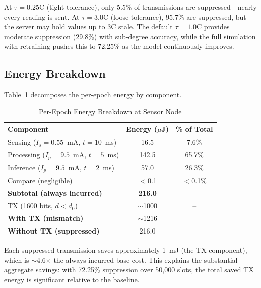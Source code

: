 \documentclass[conference]{IEEEtran}
\begin{document}
At $\tau = 0.25$\textdegree C (tight tolerance), only 5.5\% of transmissions are suppressed---nearly every reading is sent. At $\tau = 3.0$\textdegree C (loose tolerance), 95.7\% are suppressed, but the server may hold values up to 3\textdegree C stale. The default $\tau = 1.0$\textdegree C provides moderate suppression (29.8\%) with sub-degree accuracy, while the full simulation with retraining pushes this to 72.25\% as the model continuously improves.

\subsection{Energy Breakdown}

Table~\ref{tab:energy_breakdown} decomposes the per-epoch energy by component.

\begin{table}[htbp]
\caption{Per-Epoch Energy Breakdown at Sensor Node}
\begin{center}
\begin{tabular}{lcc}
\toprule
\textbf{Component} & \textbf{Energy ($\mu$J)} & \textbf{\% of Total} \\
\midrule
Sensing ($I_s = 0.55$~mA, $t = 10$~ms) & 16.5  & 7.6\% \\
Processing ($I_p = 9.5$~mA, $t = 5$~ms) & 142.5 & 65.7\% \\
Inference ($I_p = 9.5$~mA, $t = 2$~ms)  & 57.0  & 26.3\% \\
Compare (negligible)                      & $<$0.1 & $<$0.1\% \\
\midrule
\textbf{Subtotal (always incurred)}       & \textbf{216.0} & -- \\
\midrule
TX (1600 bits, $d < d_0$)         & $\sim$1000 & -- \\
\midrule
\textbf{With TX (mismatch)}       & $\sim$1216 & -- \\
\textbf{Without TX (suppressed)}  & 216.0 & -- \\
\bottomrule
\end{tabular}
\label{tab:energy_breakdown}
\end{center}
\end{table}

Each suppressed transmission saves approximately 1~mJ (the TX component), which is $\sim$4.6$\times$ the always-incurred base cost. This explains the substantial aggregate savings: with 72.25\% suppression over 50,000 slots, the total saved TX energy is significant relative to the baseline.

\end{document}
